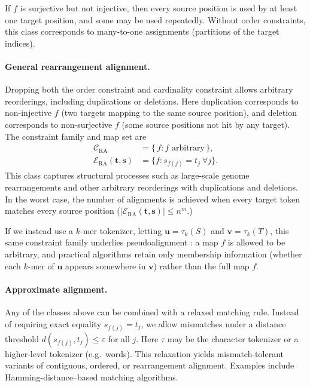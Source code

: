 If $f$ is surjective but not injective, then every source position is used by at least one target position, and some may be used repeatedly. Without order constraints, this class corresponds to many-to-one assignments (partitions of the target indices).

\paragraph{General rearrangement alignment.}
Dropping both the order constraint and cardinality constraint allows arbitrary reorderings, including duplications or deletions. Here duplication corresponds to non-injective $f$ (two targets mapping to the same source position), and deletion corresponds to non-surjective $f$ (some source positions not hit by any target). The constraint family and map set are
\begin{align}
\mathcal{C}_{\mathrm{RA}}
&=
\{\, f : f \text{ arbitrary} \,\}, \\
\mathcal{E}_{\mathrm{RA}}(\mathbf{t},\mathbf{s}) &= \big\{ f : s_{f(j)} = t_j \ \forall j \big\}.
\end{align}
This class captures structural processes such as large-scale genome rearrangements and other arbitrary reorderings with duplications and deletions. In the worst case, the number of alignments is achieved when every target token matches every source position ($|\mathcal{E}_{\mathrm{RA}}(\mathbf{t},\mathbf{s})| \le n^m$.)

If we instead use a $k$-mer tokenizer, letting $\mathbf{u}=\tau_k(S)$ and $\mathbf{v}=\tau_k(T)$, this same constraint family underlies pseudoalignment \citep{Bray2016kallisto, Melsted2021, Sullivan2025}: a map $f$ is allowed to be arbitrary, and practical algorithms retain only membership information (whether each $k$-mer of $\mathbf{u}$ appears somewhere in $\mathbf{v}$) rather than the full map $f$.

\paragraph{Approximate alignment.}
Any of the classes above can be combined with a relaxed matching rule. Instead of requiring exact equality $s_{f(j)} = t_j$, we allow mismatches under a distance threshold $d(s_{f(j)},t_j) \le \varepsilon$ for all $j$. Here $\tau$ may be the character tokenizer or a higher-level tokenizer (e.g.\ words). This relaxation yields mismatch-tolerant variants of contiguous, ordered, or rearrangement alignment. Examples include Hamming-distance--based matching algorithms.

